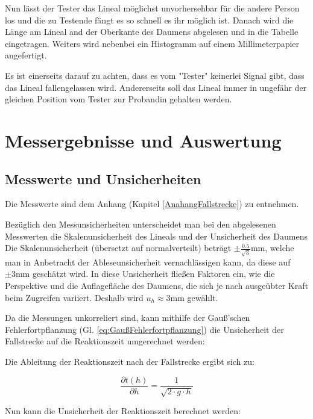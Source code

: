 \documentclass[a4paper,12pt]{article}
\begin{document}
Nun lässt der Tester das Lineal möglichst unvorhersehbar für die andere Person los und die zu Testende fängt es 
so schnell es ihr möglich ist.
Danach wird die Länge am Lineal and der Oberkante des Daumens abgelesen und in
die Tabelle eingetragen. Weiters wird nebenbei ein Histogramm auf einem Millimeterpapier
angefertigt.

Es ist einerseits darauf zu achten, dass es vom "Tester" keinerlei Signal gibt, dass das Lineal
fallengelassen wird. Andererseits soll das Lineal immer in ungefähr der gleichen Position vom Tester zur Probandin
gehalten werden.

\section{Messergebnisse und Auswertung}
\subsection{Messwerte und Unsicherheiten}

Die Messwerte sind dem Anhang (Kapitel \ref{AnahangFallstrecke}) zu entnehmen. 

Bezüglich den Messunsicherheiten unterscheidet man bei den abgelesenen Messwerten die 
Skalenunsicherheit des Lineals und der Unsicherheit des Daumens 
Die Skalenunsicherheit (übersetzt auf normalverteilt) beträgt $\pm \frac{0.5}{\sqrt{3}}\mathrm{mm}$,
welche man in Anbetracht der Ableseunsicherheit vernachlässigen kann, da diese auf $\pm 3\mathrm{mm}$
geschätzt wird. In diese Unsicherheit fließen Faktoren ein, wie die Perspektive
und die Auflagefläche des Daumens, die sich je nach ausgeübter Kraft beim Zugreifen variiert.
Deshalb wird $u_h \approx 3\mathrm{mm}$ gewählt.

Da die Messungen unkorreliert sind, kann mithilfe der Gauß'schen Fehlerfortpflanzung
(Gl. \ref{eq:GaußFehlerfortpflanzung}) die Unsicherheit der Fallstrecke auf die Reaktionszeit umgerechnet werden:

Die Ableitung der Reaktionszeit nach der Fallstrecke ergibt sich zu:

\begin{equation}
    \frac{\partial t(h)}{\partial h} = \frac{1}{\sqrt{2 \cdot g \cdot h}}
\end{equation}

Nun kann die Unsicherheit der Reaktionszeit berechnet werden:
\end{document}
